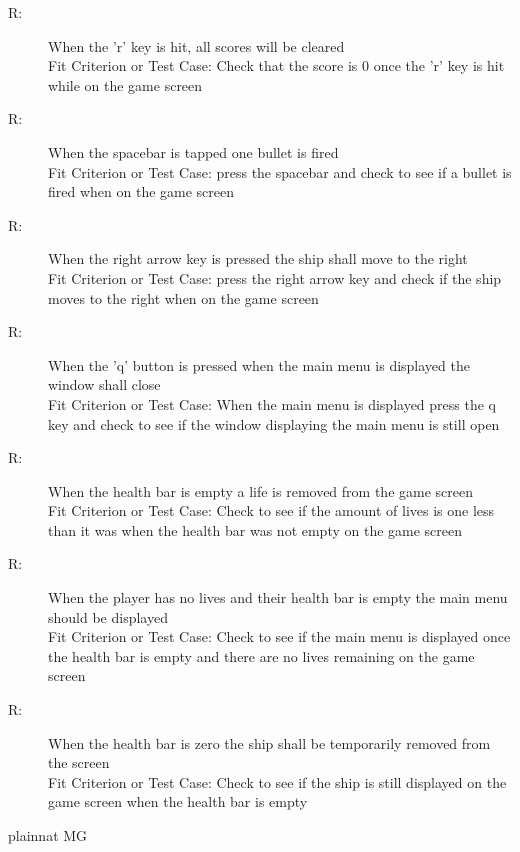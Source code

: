\documentclass[12pt, titlepage]{article}
\newcounter{fnum}
\newcommand{\fthefnum}{R\thefnum}
\begin{document}
\begin{description}
\item [ \fthefnum \label{fRH}:] 
When the 'r' key is hit, all scores will be cleared
\\Fit Criterion or Test Case: Check that the score is 0 once the 'r' key is hit while on the game screen

\item [ \fthefnum \label{fRI}:] 
When the spacebar is tapped one bullet is fired
\\Fit Criterion or Test Case: press the spacebar and check to see if a bullet is fired when on the game screen

\item [ \fthefnum \label{fRJ}:] 
When the right arrow key is pressed the ship shall move to the right
\\Fit Criterion or Test Case: press the right arrow key and check if the ship moves to the right when on the game screen

\item [ \fthefnum \label{fRK}:] 
When the 'q' button is pressed when the main menu is displayed the window shall close
\\Fit Criterion or Test Case: When the main menu is displayed press the q key and check to see if the window displaying the main menu is still open

\item [ \fthefnum \label{fRL}:] 
When the health bar is empty a life is removed from the game screen
\\Fit Criterion or Test Case: Check to see if the amount of lives is one less than it was when the health bar was not empty on the game screen

\item [ \fthefnum \label{fRM}:] 
When the player has no lives and their health bar is empty the main menu should be displayed
\\Fit Criterion or Test Case: Check to see if the main menu is displayed once the health bar is empty and there are no lives remaining on the game screen

\item [ \fthefnum \label{fRN}:] 
When the health bar is zero the ship shall be temporarily removed from the screen
\\Fit Criterion or Test Case: Check to see if the ship is still displayed on the game screen when the health bar is empty

\end{description}

\newpage


 {plainnat}
 {MG}
\end{document}
